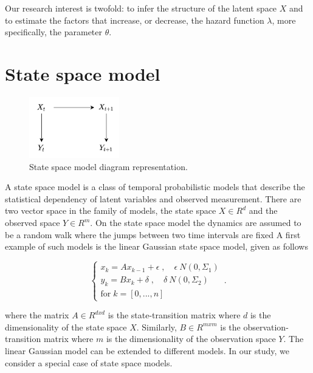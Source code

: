 \documentclass[mscthesis]{usiinfthesis}
\begin{document}
Our research interest is twofold: to infer the structure of the latent space $X$ and to estimate the factors that increase, or decrease, the hazard function $\lambda$, more specifically, the parameter $\theta$.


\section{State space model}
\label{sec:latent_space}

\begin{figure}[H]
    \centering
    \includegraphics[width=0.35\textwidth]{statespace_diagram.png}
    \caption{State space model diagram representation.}
    \label{fig:pdf_invasion}
\end{figure}


A state space model is a class of temporal probabilistic models that describe the statistical dependency of latent variables and observed measurement. There are two vector space in the family of models, the state space $X \in R^d$ and the observed space $Y \in R^m$. On the state space model the dynamics are assumed to be a random walk where the jumps between two time intervals are fixed A first example of such models is the linear Gaussian state space model, given as follows

\begin{eqfloat}
\begin{equation}
    \begin{cases}
      x_k = A x_{k-1} + \epsilon \; , \quad \epsilon ~ N(0, \Sigma_1) \\
      y_k = B x_k + \delta  \; , \quad \delta ~ N(0, \Sigma_2)  \\
      \textrm{for} \; k = [0, ..., n]
    \end{cases}\,.
\label{eq:latent_randomwalk}
\end{equation}
\caption{State space model}
\end{eqfloat}

where the matrix $A \in R^{dxd}$ is the state-transition matrix where $d$ is the dimensionality of the state space $X$. Similarly, $B \in R^{mxm}$ is the observation-transition matrix where $m$ is the dimensionality of the observation space $Y$. The linear Gaussian model can be extended to different models. In our study, we consider a special case of state space models.
\end{document}
